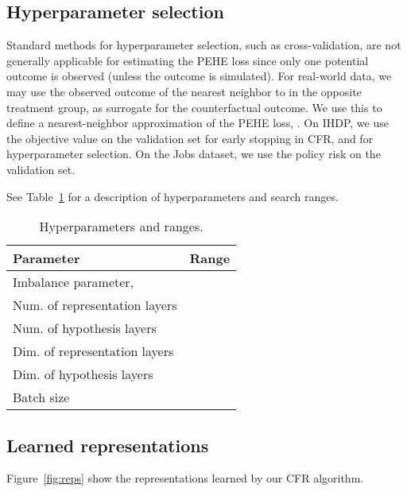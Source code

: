 \documentclass{article}
\begin{document}
\subsection{Hyperparameter selection}
Standard methods for hyperparameter selection, such as cross-validation, are not generally applicable for estimating the PEHE loss since only one potential outcome is observed (unless the outcome is simulated). For real-world data, we may use the observed outcome  of the nearest neighbor  to  in the opposite treatment group,  as surrogate for the counterfactual outcome. We use this to define a nearest-neighbor approximation of the PEHE loss, . On IHDP, we use the objective value on the validation set for early stopping in CFR, and  for hyperparameter selection. On the Jobs dataset, we use the policy risk on the validation set.

See Table~\ref{tbl:hypparams} for a description of hyperparameters and search ranges.

\begin{table}[t!]
  \caption{\label{tbl:hypparams}Hyperparameters and ranges.}
  \begin{center}
      \begin{tabular}{ll}
        Parameter & Range \\ \hline
        Imbalance parameter,  &  \\
        Num. of representation layers &  \\
        Num. of hypothesis layers &  \\
        Dim. of representation layers &  \\
        Dim. of hypothesis layers &  \\
        Batch size &  \\
        \hline
      \end{tabular}
    \end{center}
\end{table}

\subsection{Learned representations}
Figure~\ref{fig:reps} show the representations learned by our CFR algorithm.
\end{document}

